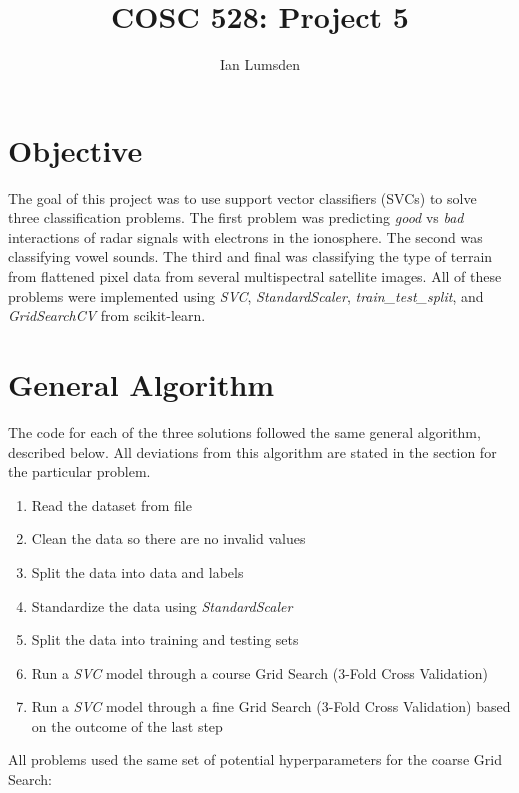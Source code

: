 \documentclass[12pt]{article}
\title{COSC 528: Project 5}
\author{Ian Lumsden}
\begin{document}
	\maketitle
	\newpage
	
	\section{Objective}
	The goal of this project was to use support vector classifiers (SVCs) to solve three classification problems. The first problem was predicting \textit{good} vs \textit{bad} interactions of radar signals with electrons in the ionosphere. The second was classifying vowel sounds. The third and final was classifying the type of terrain from flattened pixel data from several multispectral satellite images. All of these problems were implemented using \textit{SVC}, \textit{StandardScaler}, \textit{train\_test\_split}, and \textit{GridSearchCV} from scikit-learn.
	
	\section{General Algorithm}
	The code for each of the three solutions followed the same general algorithm, described below. All deviations from this algorithm are stated in the section for the particular problem.
	\begin{enumerate}
		\item Read the dataset from file
		\item Clean the data so there are no invalid values
		\item Split the data into data and labels
		\item Standardize the data using \textit{StandardScaler}
		\item Split the data into training and testing sets
		\item Run a \textit{SVC} model through a course Grid Search (3-Fold Cross Validation)
		\item Run a \textit{SVC} model through a fine Grid Search (3-Fold Cross Validation) based on the outcome of the last step
	\end{enumerate}
    All problems used the same set of potential hyperparameters for the coarse Grid Search:
\end{document}
